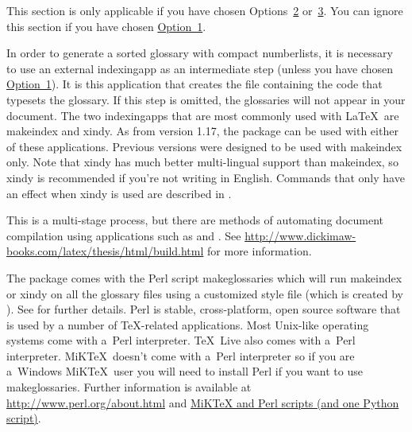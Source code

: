 \documentclass[report,inlinetitle]{nlctdoc}
\newcommand*{\opt}[1]{\hyperlink{option#1}{Option~#1}}
\newcommand*{\optsor}[2]{Options~\hyperlink{option#1}{#1}
or~\hyperlink{option#2}{#2}}
\begin{document}
\begin{important}
This section is only applicable if you have chosen \optsor23. You can
ignore this section if you have chosen \opt1.
\end{important}

In order to generate a sorted glossary with compact
\glspl{numberlist}, it is necessary to use an external
\gls{indexingapp} as an intermediate step (unless you have chosen
\opt1). It is this application that creates the file containing the
code that typesets the glossary. If this step is omitted, the
glossaries will not appear in your document. The two
\glspl*{indexingapp} that are most commonly used with \LaTeX\ are
\gls{makeindex} and \gls{xindy}. As from version 1.17, the
 package can be used with either of these
applications. Previous versions were designed to be used with
\gls*{makeindex} only. Note that \gls*{xindy} has much better
multi-lingual support than \gls*{makeindex}, so \gls*{xindy} is
recommended if you're not writing in English. Commands that only
have an effect when \gls*{xindy} is used are described in
.

\begin{important}
This is a multi-stage process, but there are methods of automating
document compilation using applications such as  and
. See
\url{http://www.dickimaw-books.com/latex/thesis/html/build.html} for
more information.
\end{important}

The  package comes with the Perl script
\gls{makeglossaries} which will run \gls{makeindex} or \gls{xindy}
on all the glossary files using a customized style file (which is
created by ). See
 for further
details. Perl is stable, cross-platform, open source software that
is used by a number of \TeX-related applications. Most Unix-like
operating systems come with a~Perl interpreter. \TeX~Live also comes
with a~Perl interpreter. MiK\TeX\ doesn't come with a~Perl
interpreter so if you are a~Windows MiK\TeX\ user you will need to
install Perl if you want to use \gls{makeglossaries}.
Further information is available at \url{http://www.perl.org/about.html}
and
\href{http://tex.stackexchange.com/questions/158796/miktex-and-perl-scripts-and-one-python-script}{MiKTeX and Perl scripts (and one Python script)}.
\end{document}
